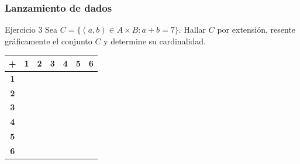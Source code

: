 \documentclass[aspectratio=169]{beamer}
\begin{document}
\begin{frame}[t]
	\frametitle{Lanzamiento de dados}
	\begin{block}{Ejercicio 3}
		Sea $C=\{(a, b)\in A\times B: a+b=7\}$. Hallar $C$ por extensión, resente gráficamente el conjunto $C$ y determine su cardinalidad.
	\end{block}


	\renewcommand{\arraystretch}{1.3} %
	\begin{flushleft}
		\begin{tabular}{|c|*{6}{c|}}
			\hline
			\cellcolor{gray!30} \textbf{+}
			                                & \cellcolor{yellow} \textbf{1}
			                                & \cellcolor{yellow} \textbf{2}
			                                & \cellcolor{yellow} \textbf{3}
			                                & \cellcolor{yellow} \textbf{4}
			                                & \cellcolor{yellow} \textbf{5}
			                                & \cellcolor{yellow} \textbf{6}               \\
			\hline
			\cellcolor{green!70} \textbf{1} &                               &  &  &  &  & \\ \hline
			\cellcolor{green!70} \textbf{2} &                               &  &  &  &  & \\ \hline
			\cellcolor{green!70} \textbf{3} &                               &  &  &  &  & \\ \hline
			\cellcolor{green!70} \textbf{4} &                               &  &  &  &  & \\ \hline
			\cellcolor{green!70} \textbf{5} &                               &  &  &  &  & \\ \hline
			\cellcolor{green!70} \textbf{6} &                               &  &  &  &  & \\
			\hline
		\end{tabular}
	\end{flushleft}



\end{frame}
\end{document}
